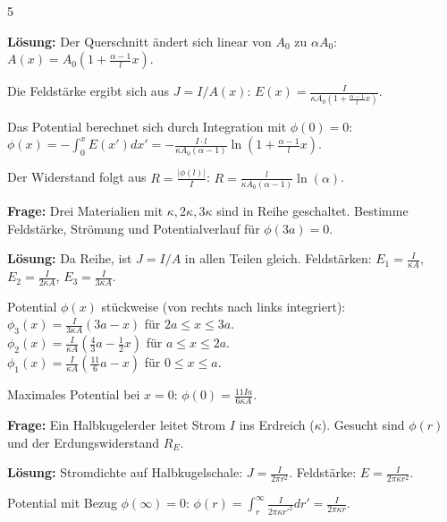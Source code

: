 \documentclass[a4paper, 2pt, landscape]{extarticle}
\begin{document}
\begin{multicols*}{5}
\begin{tcolorbox}[title={Aufgabe 2: Strömungsfeld Kegel (Blatt 5)}]
\textbf{Lösung:}
Der Querschnitt ändert sich linear von $A_0$ zu $\alpha A_0$: 
$A(x) = A_0 (1 + \frac{\alpha - 1}{l} x)$.

Die Feldstärke ergibt sich aus $J = I/A(x)$: 
$E(x) = \frac{I}{\kappa A_0 (1 + \frac{\alpha - 1}{l} x)}$.

Das Potential berechnet sich durch Integration mit $\phi(0) = 0$: \\
$\phi(x) = -\int_{0}^{x} E(x') dx' = -\frac{I \cdot l}{\kappa A_0 (\alpha - 1)} \ln(1 + \frac{\alpha - 1}{l} x)$.

Der Widerstand folgt aus $R = \frac{|\phi(l)|}{I}$: 
$R = \frac{l}{\kappa A_0 (\alpha - 1)} \ln(\alpha)$.
\end{tcolorbox}

\begin{tcolorbox}[title={Aufgabe 1: Geschichtetes Medium I (Blatt 5)}]
\textbf{Frage:} Drei Materialien mit $\kappa, 2\kappa, 3\kappa$ sind in Reihe geschaltet. Bestimme Feldstärke, Strömung und Potentialverlauf für $\phi(3a) = 0$.

\textbf{Lösung:}
Da Reihe, ist $J = I/A$ in allen Teilen gleich.
Feldstärken: $E_1 = \frac{I}{\kappa A}$, $E_2 = \frac{I}{2\kappa A}$, $E_3 = \frac{I}{3\kappa A}$.

Potential $\phi(x)$ stückweise (von rechts nach links integriert): \\
$\phi_3(x) = \frac{I}{3\kappa A} (3a - x)$ für $2a \le x \le 3a$. \\
$\phi_2(x) = \frac{I}{\kappa A} (\frac{4}{3}a - \frac{1}{2}x)$ für $a \le x \le 2a$. \\
$\phi_1(x) = \frac{I}{\kappa A} (\frac{11}{6}a - x)$ für $0 \le x \le a$.

Maximales Potential bei $x=0$: $\phi(0) = \frac{11 I a}{6 \kappa A}$.
\end{tcolorbox}

\begin{tcolorbox}[title={Aufgabe 4: Kugelerder I (Blatt 5)}]
\textbf{Frage:} Ein Halbkugelerder leitet Strom $I$ ins Erdreich ($\kappa$). Gesucht sind $\phi(r)$ und der Erdungswiderstand $R_E$.

\textbf{Lösung:}
Stromdichte auf Halbkugelschale: $J = \frac{I}{2\pi r^2}$. Feldstärke: $E = \frac{I}{2\pi \kappa r^2}$.

Potential mit Bezug $\phi(\infty) = 0$: 
$\phi(r) = \int_{r}^{\infty} \frac{I}{2\pi \kappa r'^2} dr' = \frac{I}{2\pi \kappa r}$.


\end{tcolorbox}
\end{multicols*}
\end{document}

